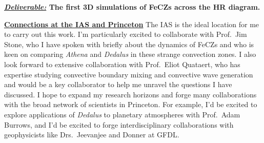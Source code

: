 \documentclass[12pt]{article}
\newcommand{\sct}[1]{\vspace{0.3cm}\hspace{-\parindent}\textbf{\underline{#1}}\hspace{0.3cm}}
\begin{document}
\textbf{\underline{\emph{Deliverable:}} The first 3D simulations of FeCZs across the HR diagram.}

\sct{Connections at the IAS and Princeton}
The IAS is the ideal location for me to carry out this work.
I'm particularly excited to collaborate with Prof.~Jim Stone, who I have spoken with briefly about the dynamics of FeCZs and who is keen on comparing \emph{Athena} and \emph{Dedalus} in these strange convection zones.
I also look forward to extensive collaboration with  Prof.~Eliot Quataert, who has expertise studying convective boundary mixing and convective wave generation and would be a key collaborator to help me unravel the questions I have discussed.
I hope to expand my research horizons and forge many collaborations with the broad network of scientists in Princeton.
For example, I'd be excited to explore applications of \emph{Dedalus} to planetary atmospheres with Prof.~Adam Burrows, and I'd be excited to forge interdisciplinary collaborations with geophysicists like Drs.~Jeevanjee and Donner at GFDL.



{\scriptsize

}
\end{document}
